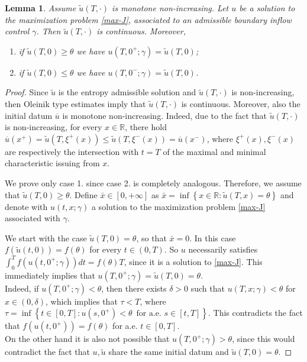 \documentclass[a4paper, 10pt, final]{article}
\newtheorem{lemma}{Lemma}[section]
\newcommand{\R}{\mathbb{R}} \newcommand{\N}{\mathbb{N}}
\begin{document}
\begin{lemma}
  \label{lemmararefaction} 
  Assume $\widetilde u(T, \cdot)$ is monotone non-increasing.  
  Let    $u$ be a solution to the maximization problem \eqref{max-J}, associated to an admissible
  boundary inflow control $\gamma$. 
  Then $\widetilde{u}(T, \cdot)$ is continuous. Moreover,
  \begin{enumerate}
    \item if $\widetilde u(T, 0)\geq \theta $ we have  $u(T, 0^+; \gamma)=\widetilde u(T, 0)$;
    \item  if $\widetilde u(T, 0)\leq \theta $ we have  $u(T, 0^-; \gamma)=\widetilde u(T, 0)$.
  \end{enumerate} 
\end{lemma} 
\begin{proof} 
  Since $\widetilde{u}$ is the entropy admissible solution
  and $\widetilde{u}(T, \cdot)$ is non-increasing, then Oleinik type estimates imply that
  $\widetilde{u}(T, \cdot)$ is continuous. Moreover, 
  also the initial datum $\overline u$ is monotone non-increasing. 
  Indeed, due to the fact that  $\widetilde u(T,\cdot)$ is non-increasing, 
  for every $x\in \R$, there hold $\overline u(x^+)= \widetilde u(T, \xi^+(x))\leq  \widetilde u(T, \xi^-(x))=\overline u(x^-)$, 
  where $\xi^+(x), \xi^-(x)$ are respectively the intersection with $t=T$ of the maximal 
  and minimal characteristic issuing from $x$.

  We prove only case 1. since case 2. is completely analogous. Therefore, we assume that
  $\widetilde u(T, 0)\geq \theta$. Define $\bar x\in [0, +\infty]$ 
  as $\bar x = \inf \left\{x \in \R: \widetilde{u}(T, x) = \theta\right\}$ and denote
  with $u(t,x;\gamma)$ a solution to the maximization problem \eqref{max-J} associated with $\gamma$.

  We start with the case $\widetilde{u}(T, 0) = \theta$, so  that  $\bar x=0$. 
  In this case $f(\widetilde u(t,0)) = f(\theta)$ for every $t\in (0, T)$. 
  So $u$ necessarily satisfies $\int_0^T f(u(t, 0^+; \gamma))dt = f(\theta)T$, since it is a solution to \eqref{max-J}. 
  This immediately implies that $u(T, 0^+; \gamma) = \widetilde u(T, 0) = \theta$. \\
  Indeed, if $u(T, 0^+; \gamma) < \theta$, then there exists $\delta>0$ such that 
  $u(T, x; \gamma)<\theta$ for 
  $x\in (0, \delta)$, which implies that $\tau < T$, where
  $\tau=\inf\left\{t\in [0, T]: u(s, 0^+) < \theta \, \textrm{ for a.e. } s \in [t, T]\right\}$.
  This contradicts the fact that $f(u(t,0^+))=f(\theta)$ for a.e. $t \in [0, T]$. \\
  On the other hand it is also not possible that $u(T, 0^+; \gamma)>\theta$, since this would contradict 
  the fact that $u, \widetilde u$ share the same initial datum and $\widetilde u(T,0) = \theta$. 


\end{proof}
\end{document}
